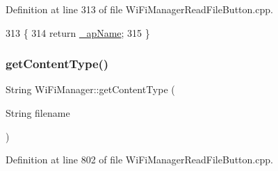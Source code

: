 Definition at line 313 of file Wi\+Fi\+Manager\+Read\+File\+Button.\+cpp.


\begin{DoxyCode}
313                                         \{
314   \textcolor{keywordflow}{return} \hyperlink{class_wi_fi_manager_a2c27e2f375122254cde4b2fd9ed1e117}{\_apName};
315 \}
\end{DoxyCode}
\mbox{\label{class_wi_fi_manager_a40f123fd290c3e331c9785d19a88f3b8}} 
\subsubsection{\texorpdfstring{get\+Content\+Type()}{getContentType()}}
{\footnotesize\ttfamily String Wi\+Fi\+Manager\+::get\+Content\+Type (\begin{DoxyParamCaption}\item[{String}]{filename }\end{DoxyParamCaption})\hspace{0.3cm}{\ttfamily [private]}}



Definition at line 802 of file Wi\+Fi\+Manager\+Read\+File\+Button.\+cpp.


